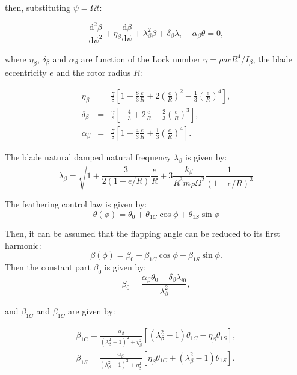   \noindent
  then, substituting $\psi = \Omega t$:

  \begin{equation}
    \frac{\mathrm{d}^2\beta}{\mathrm{d}\psi^2} + \eta_\beta \frac{\mathrm{d}\beta}{\mathrm{d}\psi} + \lambda_\beta^2\beta + \delta_\beta \lambda_i - \alpha_\beta \theta = 0,
  \end{equation}

  \noindent
  where $\eta_\beta$, $\delta_\beta$ and $\alpha_\beta$ are function of the Lock number $\gamma = \rho a c R^4 / I_\beta$, the blade eccentricity $e$ and the rotor radius $R$:

  \begin{eqnarray}
    \eta_\beta &=& \frac{\gamma}{8} \left[ 1 - \frac{8}{3}\frac{e}{R} + 2 \left(\frac{e}{R}\right)^2 - \frac{1}{3}\left(\frac{e}{R}\right)^4 \right], \\[6pt]
    \delta_\beta &=& \frac{\gamma}{8} \left[- \frac{4}{3} + 2 \frac{e}{R} - \frac{2}{3}\left(\frac{e}{R}\right)^3 \right], \\[6pt]
    \alpha_\beta &=& \frac{\gamma}{8} \left[1 - \frac{4}{3} \frac{e}{R} + \frac{1}{3}\left(\frac{e}{R}\right)^4 \right].
  \end{eqnarray}

  \noindent %
  The blade natural damped natural frequency $\lambda_\beta$ is given by:$$\lambda_\beta = \sqrt{  1 + \frac{3}{2(1 - e/R)}\frac{e}{R} + 3 \frac{k_\beta}{R^3 m_P \Omega^2} \frac{1}{(1 - e/R)^3} }$$ 
  
  \noindent
  The feathering control law is given by: $$ \theta(\phi) = \theta_0 + \theta_{1C}\cos{\phi} + \theta_{1S}\sin{\phi}$$

  Then, it can be assumed that the flapping angle can be reduced to its first harmonic: $$\beta(\phi) = \beta_0 + \beta_{1C}\cos{\phi} + \beta_{1S}\sin{\phi}.$$ Then the constant part $\beta_0$ is given by: $$\beta_0 = \frac{\alpha_\beta \theta_0 - \delta_\beta \lambda_{i0}}{\lambda_\beta^2},$$

  \noindent
  and $\beta_{1C}$ and $\beta_{1C}$ are given by:

  \begin{eqnarray}
    \beta_{1C} = \frac{\alpha_\beta}{(\lambda_\beta^2 - 1)^2 + \eta_\beta^2} [(\lambda_\beta^2 - 1)\theta_{1C} - \eta_\beta \theta_{1S}], \\[6pt]
    \beta_{1S} = \frac{\alpha_\beta}{(\lambda_\beta^2 - 1)^2 + \eta_\beta^2} [\eta_\beta \theta_{1C} + (\lambda_\beta^2 - 1)\theta_{1S}].
  \end{eqnarray}

